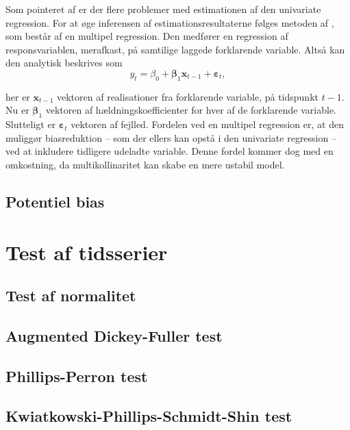 \documentclass[
  a4paper,
  oneside]{memoir}
\begin{document}
Som pointeret af \citep{Stambaugh1999} er der flere problemer med estimationen af den univariate regression. For at øge inferensen af estimationsresultaterne følges metoden af \citep{Goyal2007}, som består af en multipel regression. Den medfører en regression af responsvariablen, merafkast, på samtilige laggede forklarende variable. Altså kan den analytisk beskrives som
\[y_t=\beta_0+\bm{\beta}_1\bm{x}_{t-1}+\bm{\varepsilon}_t,\]

her er \(\bm{x}_{t-1}\) vektoren af realisationer fra forklarende variable, på tidspunkt \(t-1\). Nu er \(\bm{\beta}_1\) vektoren af hældningskoefficienter for hver af de forklarende variable. Slutteligt er \(\bm{\varepsilon}_t\) vektoren af fejlled. Fordelen ved en multipel regression er, at den muliggør biasreduktion -- som der ellers kan opstå i den univariate regression -- ved at inkludere tidligere udeladte variable. Denne fordel kommer dog med en omkostning, da multikollinaritet kan skabe en mere ustabil model.

\hypertarget{potentiel-bias}{%
\subsection{Potentiel bias}\label{potentiel-bias}}

\hypertarget{sektestaftids}{%
\section{Test af tidsserier}\label{sektestaftids}}

\hypertarget{test-af-normalitet}{%
\subsection{Test af normalitet}\label{test-af-normalitet}}

\hypertarget{augmented-dickey-fuller-test}{%
\subsection{Augmented Dickey-Fuller test}\label{augmented-dickey-fuller-test}}

\hypertarget{phillips-perron-test}{%
\subsection{Phillips-Perron test}\label{phillips-perron-test}}

\hypertarget{kwiatkowski-phillips-schmidt-shin-test}{%
\subsection{Kwiatkowski-Phillips-Schmidt-Shin test}\label{kwiatkowski-phillips-schmidt-shin-test}}
\end{document}
